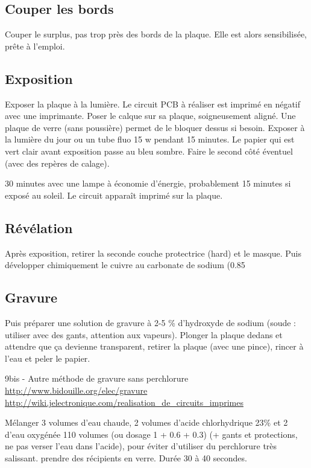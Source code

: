 {\subsection{Couper les bords}
Couper le surplus, pas trop près des bords de la plaque.
Elle est alors sensibilisée, prête à l'emploi.

\subsection{Exposition}
Exposer la plaque à la lumière.
Le circuit PCB à réaliser est imprimé en négatif avec une imprimante. Poser le calque sur sa plaque, soigneusement aligné. Une plaque de verre (sans poussière) permet de le bloquer dessus si besoin.
Exposer à la lumière du jour ou un tube fluo 15 w pendant 15 minutes. Le papier qui est vert clair avant exposition passe au bleu sombre.
Faire le second côté éventuel (avec des repères de calage).

30 minutes avec une lampe à économie d'énergie, probablement 15 minutes si exposé au soleil. Le circuit apparaît imprimé sur la plaque.

\subsection{Révélation}

Après exposition, retirer la seconde couche protectrice (hard) et le masque. Puis développer chimiquement le cuivre au carbonate de sodium (0.85 %

\subsection{Gravure}
Puis préparer une solution de gravure à 2-5 \% d'hydroxyde de sodium (soude : utiliser avec des gants, attention aux vapeurs).
Plonger la plaque dedans et attendre que ça devienne transparent, retirer la plaque (avec une pince), rincer à l'eau et peler le papier.

9bis - Autre méthode de gravure sans perchlorure
\url{http://www.bidouille.org/elec/gravure}
\url{http://wiki.jelectronique.com/realisation_de_circuits_imprimes}

Mélanger 3 volumes d'eau chaude, 2 volumes d'acide chlorhydrique 23\% et 2 d'eau oxygénée 110 volumes (ou dosage 1 + 0.6 + 0.3) (+ gants et protections, ne pas verser l'eau dans l'acide), pour éviter d'utiliser du perchlorure très salissant. prendre des récipients en verre. Durée 30 à 40 secondes.

}
